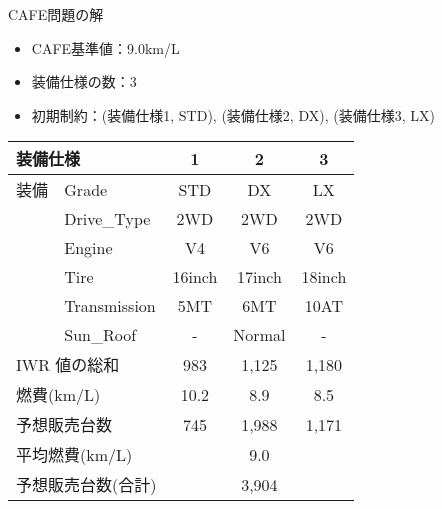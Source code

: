 \documentclass[dvipdfmx, 11pt]{beamer}
\begin{document}
\begin{frame}{CAFE問題の解}
 \begin{itemize}
  \item CAFE基準値：9.0km/L
  \item 装備仕様の数：3
  \item 初期制約：(装備仕様1, STD), (装備仕様2, DX), (装備仕様3, LX)
 \end{itemize}
 \begin{exampleblock}{}
  \centering
  \begin{tabular}{l|l|c|c|c} 
    \multicolumn{2}{l|}{装備仕様}               & 1	& 2 	 & 3	\\  \hline
    装備 & \textsf{Grade}        & \textsf{STD}    & \textsf{DX}     & \textsf{LX}\\
    &\textsf{Drive\_Type}  & \textsf{2WD}    & \textsf{2WD}    & \textsf{2WD}\\
    &\textsf{Engine}	  & \textsf{V4}     & \textsf{V6}     & \textsf{V6}\\
    &\textsf{Tire}	  & \textsf{16inch} & \textsf{17inch} & \textsf{18inch}\\
    &\textsf{Transmission} & \textsf{5MT}    & \textsf{6MT}    & \textsf{10AT}\\
    &\textsf{Sun\_Roof}    & -               & \textsf{Normal} & -  \\ \hline
    \multicolumn{2}{l|}{IWR 値の総和}           & 983  & 1,125   & 1,180 \\ %
    \multicolumn{2}{l|}{燃費(km/L)}      & 10.2  & 8.9     & 8.5 \\ %
    \multicolumn{2}{l|}{予想販売台数}    & 745   & 1,988   & 1,171  \\ \hline
    \multicolumn{2}{l|}{平均燃費(km/L)}  & \multicolumn{3}{c}{9.0} \\ 
    \multicolumn{2}{l|}{予想販売台数(合計)}  & \multicolumn{3}{c}{3,904} \\ 
  \end{tabular}
 \end{exampleblock}
\end{frame}
\end{document}
